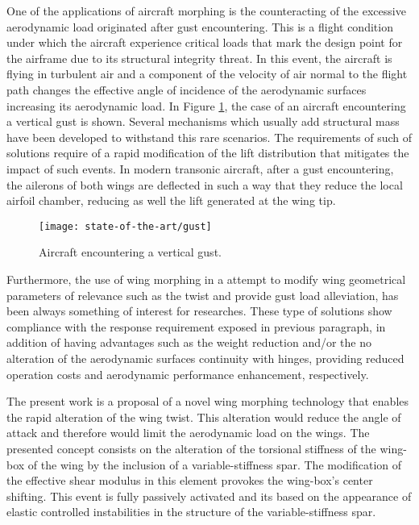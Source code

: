 One of the applications of aircraft morphing is the counteracting of the excessive aerodynamic load originated after gust encountering. This is a flight condition under which the aircraft experience critical loads that mark the design point for the airframe due to its structural integrity threat. In this event, the aircraft is flying in turbulent air and a component of the velocity of air normal to the flight path changes the effective angle of incidence of the aerodynamic surfaces increasing its aerodynamic load. In Figure \ref{fig:gust}, the case of an aircraft encountering a vertical gust is shown. Several mechanisms which usually add structural mass have been developed to withstand this rare scenarios. The requirements of such of solutions require of a rapid modification of the lift distribution that mitigates the impact of such events. In modern transonic aircraft, after a gust encountering, the ailerons of both wings are deflected in such a way that they reduce the local airfoil chamber, reducing as well the lift generated at the wing tip.

\begin{figure}[!htpb]
  \centering
  \texttt{[image: state-of-the-art/gust]}
  \caption[Aircraft encountering a vertical gust]{Aircraft encountering a vertical gust. \cite{JECooper2007}}\label{fig:gust}
\end{figure}

Furthermore, the use of wing morphing in a attempt to modify wing geometrical parameters of relevance such as the twist and provide gust load alleviation, has been always something of interest for researches. These type of solutions show compliance with the response requirement exposed in  previous paragraph, in addition of having advantages such as the weight reduction and/or the no alteration of the aerodynamic surfaces continuity with hinges, providing reduced operation costs and aerodynamic performance enhancement, respectively. 

The present work is a proposal of a novel wing morphing technology that enables the rapid alteration of the wing twist. This alteration would reduce the angle of attack and therefore would limit the aerodynamic load on the wings. The presented concept consists on the alteration of the torsional stiffness of the wing-box of the wing by the inclusion of a variable-stiffness spar. The modification of the effective shear modulus in this element provokes the wing-box's center shifting. This event is fully passively activated and its based on the appearance of elastic controlled instabilities in the structure of the variable-stiffness spar.

